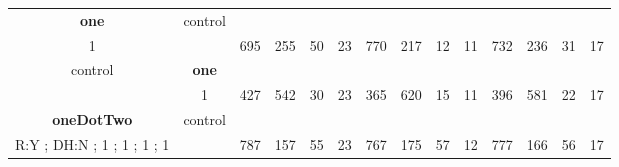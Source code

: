 \begin{table}[H]
{\begin{tabular}{|c|c|c|c|c|c|c|c|c|c|c|c|c|c|}
\cellcolor{blue!15}\textbf{one} & control& {\color[HTML]{00009B} } & {\color[HTML]{9A0000} } & {\color[HTML]{009901} } &  & {\color[HTML]{00009B} } & {\color[HTML]{9A0000} } & {\color[HTML]{009901} } &  & {\color[HTML]{00009B} } & {\color[HTML]{9A0000} } & {\color[HTML]{009901} } &  \\ 
\cellcolor{ blue!15}1 &  & \multirow{-2}{*}{{\color[HTML]{00009B} 695}} & \multirow{-2}{*}{{\color[HTML]{9A0000} 255}} & \multirow{-2}{*}{{\color[HTML]{009901} 50}} & \multirow{-2}{*}{23} & \multirow{-2}{*}{{\color[HTML]{00009B} 770}} & \multirow{-2}{*}{{\color[HTML]{9A0000} 217}} & \multirow{-2}{*}{{\color[HTML]{009901} 12}} & \multirow{-2}{*}{11} & \multirow{-2}{*}{{\color[HTML]{00009B} 732}} & \multirow{-2}{*}{{\color[HTML]{9A0000} 236}} & \multirow{-2}{*}{{\color[HTML]{009901} 31}} & \multirow{-2}{*}{17} \\ \hline

control & \cellcolor{blue!15}\textbf{one}& {\color[HTML]{00009B} } & {\color[HTML]{9A0000} } & {\color[HTML]{009901} } &  & {\color[HTML]{00009B} } & {\color[HTML]{9A0000} } & {\color[HTML]{009901} } &  & {\color[HTML]{00009B} } & {\color[HTML]{9A0000} } & {\color[HTML]{009901} } &  \\ 
 & \cellcolor{ blue!15}1 & \multirow{-2}{*}{{\color[HTML]{00009B} 427}} & \multirow{-2}{*}{{\color[HTML]{9A0000} 542}} & \multirow{-2}{*}{{\color[HTML]{009901} 30}} & \multirow{-2}{*}{23} & \multirow{-2}{*}{{\color[HTML]{00009B} 365}} & \multirow{-2}{*}{{\color[HTML]{9A0000} 620}} & \multirow{-2}{*}{{\color[HTML]{009901} 15}} & \multirow{-2}{*}{11} & \multirow{-2}{*}{{\color[HTML]{00009B} 396}} & \multirow{-2}{*}{{\color[HTML]{9A0000} 581}} & \multirow{-2}{*}{{\color[HTML]{009901} 22}} & \multirow{-2}{*}{17} \\ \hline


\cellcolor{blue!15}\textbf{oneDotTwo} & control& {\color[HTML]{00009B} } & {\color[HTML]{9A0000} } & {\color[HTML]{009901} } &  & {\color[HTML]{00009B} } & {\color[HTML]{9A0000} } & {\color[HTML]{009901} } &  & {\color[HTML]{00009B} } & {\color[HTML]{9A0000} } & {\color[HTML]{009901} } &  \\ 
\cellcolor{ blue!15}R:Y ; DH:N ; 1 ; 1 ; 1 ; 1 &  & \multirow{-2}{*}{{\color[HTML]{00009B} 787}} & \multirow{-2}{*}{{\color[HTML]{9A0000} 157}} & \multirow{-2}{*}{{\color[HTML]{009901} 55}} & \multirow{-2}{*}{23} & \multirow{-2}{*}{{\color[HTML]{00009B} 767}} & \multirow{-2}{*}{{\color[HTML]{9A0000} 175}} & \multirow{-2}{*}{{\color[HTML]{009901} 57}} & \multirow{-2}{*}{12} & \multirow{-2}{*}{{\color[HTML]{00009B} 777}} & \multirow{-2}{*}{{\color[HTML]{9A0000} 166}} & \multirow{-2}{*}{{\color[HTML]{009901} 56}} & \multirow{-2}{*}{17} \\ \hline


\end{tabular}}
\end{table}
